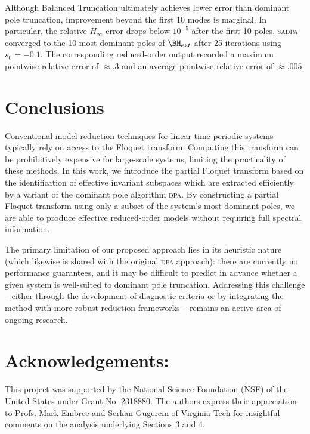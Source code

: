 \documentclass[pdflatex,sn-mathphys-num]{sn-jnl}%
\theoremstyle{thmstyleone}%
\theoremstyle{thmstyletwo}%
\theoremstyle{thmstylethree}%
\begin{document}
Although Balanced Truncation ultimately achieves lower error than dominant pole truncation,  improvement beyond the first 10 modes is marginal. In particular, the relative $H_\infty$ error drops below $10^{-5}$ after the first 10 poles. \textsc{sadpa} converged to the 10 most dominant poles of $\BH_{ext}$ after 25 iterations using $s_0=-0.1$. The corresponding reduced-order output recorded a maximum pointwise relative error of $\approx.3$ and an average pointwise relative error of $\approx .005$. \\


\section{Conclusions} \label{sec6_concl}

Conventional model reduction techniques for linear time-periodic systems typically rely on access to the Floquet transform.  Computing this transform can be prohibitively expensive for large-scale systems, limiting the practicality of these methods. In this work, we introduce the partial Floquet transform based on the identification of effective invariant subspaces which are extracted efficiently by a variant of the dominant pole algorithm \textsc{dpa}. By constructing a partial Floquet transform using only a subset of the system's most dominant poles, we are able to produce effective reduced-order models without requiring full spectral information.

The primary limitation of our proposed approach lies in its heuristic nature (which likewise is shared with the original \textsc{dpa} approach): there are currently no performance guarantees, and it may be difficult to predict in advance whether a given system is well-suited to dominant pole truncation. Addressing this challenge -- either through the development of diagnostic criteria or by integrating the method with more robust reduction frameworks -- remains an active area  of ongoing research.  

\section*{Acknowledgements:}
 This project was supported by the National Science Foundation (NSF) of the United States under Grant No. 2318880.  The authors express their appreciation to Profs. Mark Embree and Serkan Gugercin of Virginia Tech for insightful comments on the analysis underlying Sections 3 and 4.


\end{document}
